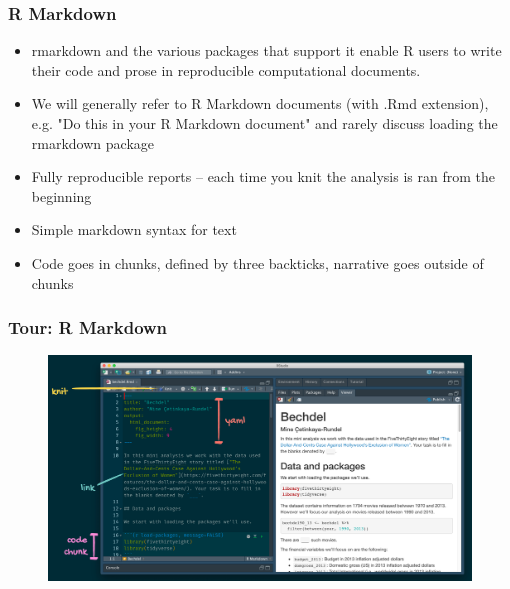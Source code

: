 \documentclass[11pt]{beamer}
\begin{document}
\begin{frame}
	
	
	\frametitle{\textbf{R Markdown}}
	
\begin{itemize}
	\item rmarkdown and the various packages that support it enable R users to write their code and prose in reproducible computational documents.
	\item We will generally refer to R Markdown documents (with .Rmd extension), e.g. "Do this in your R Markdown document" and rarely discuss loading the rmarkdown package
	\item Fully reproducible reports -- each time you knit the analysis is ran from the beginning
	\item Simple markdown syntax for text
	\item Code goes in chunks, defined by three backticks, narrative goes outside of chunks
\end{itemize}
	
\end{frame}


\begin{frame}
	
	
	\frametitle{\textbf{Tour: R Markdown}}
	
	\begin{figure}
		\centering
		\includegraphics[width=0.9\linewidth]{Images/S1/tour-rmarkdown}
	\end{figure}
	
\end{frame}


\end{document}

